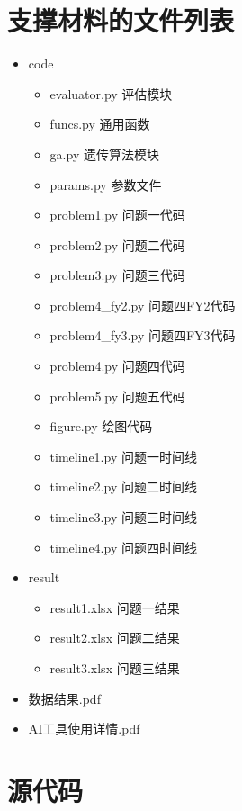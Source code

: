 \documentclass[withoutpreface,bwprint]{cumcmthesis} %
\begin{document}
\newpage
\begin{appendices}

\section{支撑材料的文件列表}

\begin{itemize}
    \item code
    \begin{itemize}
        \item evaluator.py 评估模块
        \item funcs.py 通用函数
        \item ga.py 遗传算法模块
        \item params.py 参数文件
        \item problem1.py 问题一代码
        \item problem2.py 问题二代码
        \item problem3.py 问题三代码
        \item problem4\_fy2.py 问题四FY2代码
        \item problem4\_fy3.py 问题四FY3代码
        \item problem4.py 问题四代码
        \item problem5.py 问题五代码
        \item figure.py 绘图代码
        \item timeline1.py 问题一时间线
        \item timeline2.py 问题二时间线
        \item timeline3.py 问题三时间线
        \item timeline4.py 问题四时间线
    \end{itemize}
    
    \item result
    \begin{itemize}
        \item result1.xlsx 问题一结果
        \item result2.xlsx 问题二结果
        \item result3.xlsx 问题三结果
    \end{itemize}
    
    \item 数据结果.pdf
    
    \item AI工具使用详情.pdf
\end{itemize}

\section{源代码}


\end{appendices}
\end{document}
